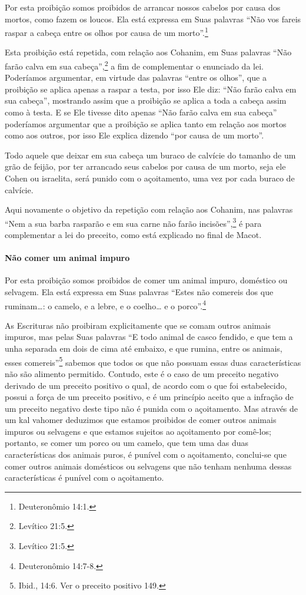 Por esta proibição somos proibidos de arrancar nossos cabelos por causa
dos mortos, como fazem os loucos. Ela está expressa em Suas palavras
``Não vos fareis raspar a cabeça entre os olhos por causa de um morto''.\footnote{Deuteronômio 14:1.}

Esta proibição está repetida, com relação aos Cohanim, em Suas
palavras ``Não farão calva em sua cabeça'',\footnote{Levítico 21:5.} a fim de
complementar o enunciado da lei. Poderíamos argumentar, em virtude das
palavras ``entre os olhos'', que a proibição se aplica apenas a raspar a
testa, por isso Ele diz: ``Não farão calva em sua cabeça'', mostrando
assim que a proibição se aplica a toda a cabeça assim como à testa. E se
Ele tivesse dito apenas ``Não farão calva em sua cabeça'' poderíamos
argumentar que a proibição se aplica tanto em relação aos mortos como
aos outros, por isso Ele explica dizendo ``por causa de um morto''.

Todo aquele que deixar em sua cabeça um buraco de calvície do tamanho de
um grão de feijão, por ter arrancado seus cabelos por causa de um morto,
seja ele Cohen ou israelita, será punido com o açoitamento, uma vez
por cada buraco de calvície.

Aqui novamente o objetivo da repetição com relação aos Cohanim, nas
palavras ``Nem a sua barba rasparão e em sua carne não farão incisões'',\footnote{Levítico 21:5.} é para complementar a lei do preceito, como está
explicado no final de Macot.

\paragraph{Não comer um animal impuro}

Por esta proibição somos proibidos de comer um animal impuro, doméstico
ou selvagem. Ela está expressa em Suas palavras ``Estes não comereis
dos que ruminam\ldots{}: o camelo, e a lebre, e o coelho\ldots{} e o porco''.\footnote{Deuteronômio 14:7-8.}

As Escrituras não proibiram explicitamente que se comam outros animais
impuros, mas pelas Suas palavras ``E todo animal de casco fendido, e que
tem a unha separada em dois de cima até embaixo, e que rumina, entre os
animais, esses comereis''\footnote{Ibid., 14:6. Ver o preceito positivo 149.} sabemos
que todos os que não possuam essas duas características não são alimento
permitido. Contudo, este é o caso de um preceito negativo derivado de um
preceito positivo o qual, de acordo com o que foi estabelecido, possui a
força de um preceito positivo, e é um princípio aceito que a infração de
um preceito negativo deste tipo não é punida com o açoitamento. Mas
através de um kal vahomer\starr{} deduzimos que
estamos proibidos de comer outros animais impuros ou selvagens e que
estamos sujeitos ao açoitamento por comê-los; portanto, se comer um
porco ou um camelo, que tem uma das duas características dos animais
puros, é punível com o açoitamento, conclui-se que comer outros animais
domésticos ou selvagens que não tenham nenhuma dessas características é
punível com o açoitamento.

